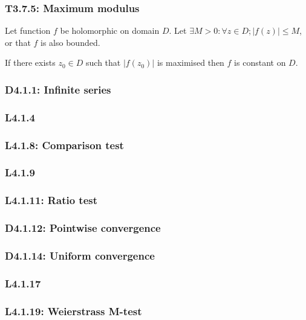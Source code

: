 \documentclass{article}
\begin{document}
\begin{multicols*}{3}
\subsubsection*{T3.7.5: Maximum modulus}
Let function $f$ be holomorphic on domain $D$.
Let $\exists M>0:\forall z\in D; |f(z)|\leq M$, or that
$f$ is also bounded.

If there exists $z_0\in D$
such that $|f(z_0)|$ is maximised then $f$ is constant on $D$.

\subsubsection*{D4.1.1: Infinite series}

\subsubsection*{L4.1.4}

\subsubsection*{L4.1.8: Comparison test}

\subsubsection*{L4.1.9}

\subsubsection*{L4.1.11: Ratio test}

\subsubsection*{D4.1.12: Pointwise convergence}

\subsubsection*{D4.1.14: Uniform convergence}

\subsubsection*{L4.1.17}

\subsubsection*{L4.1.19: Weierstrass M-test}


\end{multicols*}
\end{document}

